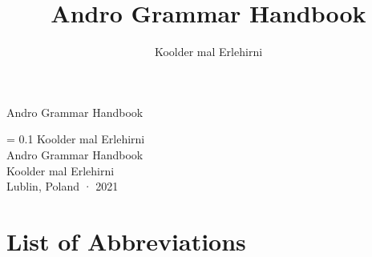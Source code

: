 \documentclass[openany, twoside, b5paper]{memoir}
\author{Koolder mal Erlehirni}
\title{Andro Grammar Handbook}
\newlength\drop
\newcommand*{\titleS}{\begingroup%
\drop = 0.1\textheight
\centering
\vspace*{\drop}
{\large Koolder mal Erlehirni}\\[2\baselineskip]
{\Huge Andro Grammar Handbook}\\[\baselineskip]
\vfill
{Koolder mal Erlehirni\\ Lublin, Poland · 2021}\par
\vspace*{\drop}
\endgroup}
\begin{document}

\frontmatter

\begin{titlingpage*}
\begin{center}
{\Huge Andro Grammar Handbook}
\end{center}
\end{titlingpage*}


\begin{titlingpage*}
\titleS
\clearpage

\end{titlingpage*}





\chapter{List of Abbreviations}
\begingroup\multicolsep=0pt
\printglossary[style=mysuper, type=leipzig, title={Glossing abbreviations}]
\endgroup
\bigskip

\cleartorecto


\cleartorecto


\mainmatter
\end{document}
